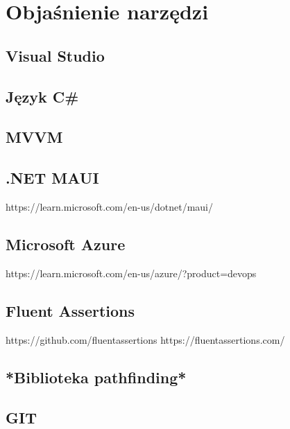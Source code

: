 \section{Objaśnienie narzędzi}

\subsection{Visual Studio}

\subsection{Język C\#}

\subsection{MVVM}

\subsection{.NET MAUI}
https://learn.microsoft.com/en-us/dotnet/maui/

\subsection{Microsoft Azure}
https://learn.microsoft.com/en-us/azure/?product=devops

\subsection{Fluent Assertions}
https://github.com/fluentassertions
https://fluentassertions.com/


\subsection{*Biblioteka pathfinding*}

\subsection{GIT}
